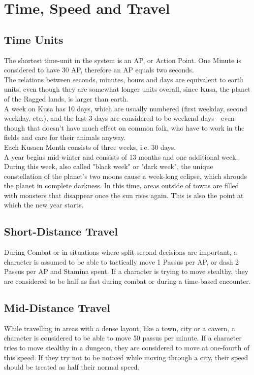 \section{Time, Speed and Travel}
\subsection{Time Units}
The shortest time-unit in the system is an AP, or Action Point. One Minute is considered to have 30 AP, therefore an AP equals two seconds.\\

The relations between seconds, minutes, hours and days are equivalent to earth units, even though they are somewhat longer units overall, since Kusa, the planet of the Ragged lands, is larger than earth.\\

A week on Kusa has 10 days, which are usually numbered (first weekday, second weekday, etc.), and the last 3 days are considered to be weekend days - even though that doesn't have much effect on common folk, who have to work in the fields and care for their animals anyway.\\

Each Kusaen Month consists of three weeks, i.e. 30 days.\\

A year begins mid-winter and consists of 13 months and one additional week. During this week, also called "black week" or "dark week", the unique constellation of the planet's two moons cause a week-long eclipse, which shrouds the planet in complete darkness. In this time, areas outside of towns are filled with monsters that disappear once the sun rises again. This is also the point at which the new year starts.\\

\subsection{Short-Distance Travel}
During Combat or in situations where split-second decisions are important, a character is assumed to be able to tactically move 1 Passus per AP, or dash 2 Passus per AP and Stamina spent. If a character is trying to move stealthy, they are considered to be half as fast during combat or during a time-based encounter.\\

\subsection{Mid-Distance Travel}
While travelling in areas with a dense layout, like a town, city or a cavern, a character is considered to be able to move 50 passus per minute. If a character tries to move stealthy in a dungeon, they are considered to move at one-fourth of this speed. If they try not to be noticed while moving through a city, their speed should be treated as half their normal speed.\\

